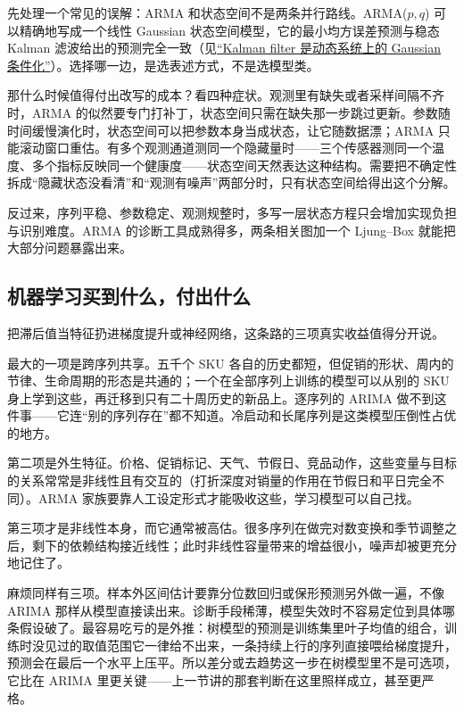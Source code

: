 先处理一个常见的误解：ARMA 和状态空间不是两条并行路线。ARMA(\(p,q\)) 可以精确地写成一个线性 Gaussian 状态空间模型，它的最小均方误差预测与稳态 Kalman 滤波给出的预测完全一致（见\hyperref[sec:13-Machine-Learning/07-Graphical-and-Sequential-Models/03]{``Kalman filter 是动态系统上的 Gaussian 条件化''}）。选择哪一边，是选表述方式，不是选模型类。

那什么时候值得付出改写的成本？看四种症状。观测里有缺失或者采样间隔不齐时，ARMA 的似然要专门打补丁，状态空间只需在缺失那一步跳过更新。参数随时间缓慢演化时，状态空间可以把参数本身当成状态，让它随数据漂；ARMA 只能滚动窗口重估。有多个观测通道测同一个隐藏量时——三个传感器测同一个温度、多个指标反映同一个健康度——状态空间天然表达这种结构。需要把不确定性拆成``隐藏状态没看清''和``观测有噪声''两部分时，只有状态空间给得出这个分解。

反过来，序列平稳、参数稳定、观测规整时，多写一层状态方程只会增加实现负担与识别难度。ARMA 的诊断工具成熟得多，两条相关图加一个 Ljung--Box 就能把大部分问题暴露出来。

\subsection{机器学习买到什么，付出什么}

把滞后值当特征扔进梯度提升或神经网络，这条路的三项真实收益值得分开说。

最大的一项是跨序列共享。五千个 SKU 各自的历史都短，但促销的形状、周内的节律、生命周期的形态是共通的；一个在全部序列上训练的模型可以从别的 SKU 身上学到这些，再迁移到只有二十周历史的新品上。逐序列的 ARIMA 做不到这件事——它连``别的序列存在''都不知道。冷启动和长尾序列是这类模型压倒性占优的地方。

第二项是外生特征。价格、促销标记、天气、节假日、竞品动作，这些变量与目标的关系常常是非线性且有交互的（打折深度对销量的作用在节假日和平日完全不同）。ARMA 家族要靠人工设定形式才能吸收这些，学习模型可以自己找。

第三项才是非线性本身，而它通常被高估。很多序列在做完对数变换和季节调整之后，剩下的依赖结构接近线性；此时非线性容量带来的增益很小，噪声却被更充分地记住了。

麻烦同样有三项。样本外区间估计要靠分位数回归或保形预测另外做一遍，不像 ARIMA 那样从模型直接读出来。诊断手段稀薄，模型失效时不容易定位到具体哪条假设破了。最容易吃亏的是外推：树模型的预测是训练集里叶子均值的组合，训练时没见过的取值范围它一律给不出来，一条持续上行的序列直接喂给梯度提升，预测会在最后一个水平上压平。所以差分或去趋势这一步在树模型里不是可选项，它比在 ARIMA 里更关键——上一节讲的那套判断在这里照样成立，甚至更严格。

